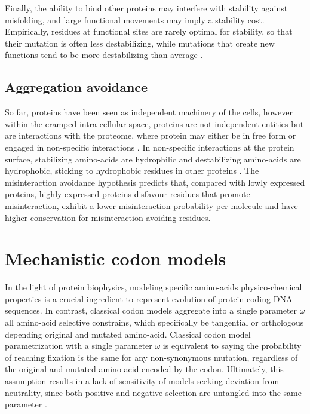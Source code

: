 Finally, the ability to bind other proteins may interfere with stability against misfolding, and large functional movements may imply a stability cost.
Empirically, residues at functional sites are rarely optimal for stability, so that their mutation is often less destabilizing, while mutations that create new functions tend to be more destabilizing than average \citep{Chi2016}.

\subsection{Aggregation avoidance}

So far, proteins have been seen as independent machinery of the cells, however within the cramped intra-cellular space, proteins are not independent entities but are interactions with the proteome, where protein may either be in free form or engaged in non-specific interactions \citep{Yang2012, Zhang2013}.
In non-specific interactions at the protein surface, stabilizing amino-acids are hydrophilic and destabilizing amino-acids are hydrophobic, sticking to hydrophobic residues in other proteins \citep{Dixit2013,Manhart2015}.
The misinteraction avoidance hypothesis predicts that, compared with lowly expressed proteins, highly expressed proteins disfavour residues that promote misinteraction, exhibit a lower misinteraction probability per molecule and have higher conservation for misinteraction-avoiding residues.


\section{Mechanistic codon models}
In the light of protein biophysics, modeling specific amino-acids physico-chemical properties is a crucial ingredient to represent evolution of protein coding DNA sequences.
In contrast, classical codon models aggregate into a single parameter $\omega$ all amino-acid selective constrains, which specifically be tangential or orthologous depending original and mutated amino-acid.
Classical codon model parametrization with a single parameter $\omega$ is equivalent to saying the probability of reaching fixation is the same for any non-synonymous mutation, regardless of the original and mutated amino-acid encoded by the codon.
Ultimately, this assumption results in a lack of sensitivity of models seeking deviation from neutrality, since both positive and negative selection are untangled into the same parameter \citep{Rodrigue2008a}.

